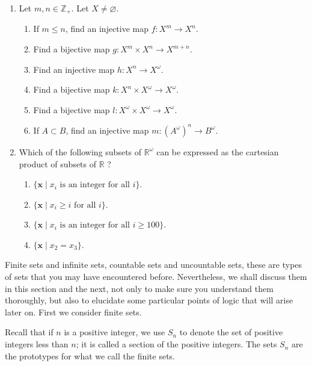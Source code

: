 \begin{enumerate}[itemsep=0.4em, parsep=0pt, topsep=0pt, partopsep=0pt, leftmargin=*, label=\arabic*., ref=\arabic*]
\item Let \(m,n \in {\mathbb{Z}}_{+}\). Let \(X \neq \varnothing\).
  \begin{enumerate}[itemsep=0.2em, parsep=0pt, topsep=0pt, partopsep=0pt, leftmargin=*, label=(\alph*), align=left]
  \item If \(m \leq n\), find an injective map \(f : X^{m} \rightarrow {X}^{n}\).
  \item Find a bijective map \(g : X^{m} \times {X}^{n} \rightarrow {X}^{m + n}\).
  \item Find an injective map \(h : X^{n} \rightarrow {X}^{\omega }\).
  \item Find a bijective map \(k : X^{n} \times {X}^{\omega } \rightarrow {X}^{\omega }\).
  \item Find a bijective map \(l : X^{\omega } \times {X}^{\omega } \rightarrow {X}^{\omega }\).
  \item If \(A \subset B\), find an injective map \(m : {(A^{\omega }) }^{n} \rightarrow {B}^{\omega }\).
  \end{enumerate}
\item Which of the following subsets of \(\mathbb{R}^{\omega }\) can be expressed as the cartesian product of subsets of \(\mathbb{R}\) ?
  \begin{enumerate}[itemsep=0.2em, parsep=0pt, topsep=0pt, partopsep=0pt, leftmargin=*, label=(\alph*), align=left]
  \item \(\{ {\mathbf{x} \mid {x}_{i}\text{ is an integer for all }i}\}\).
  \item \(\{ {\mathbf{x} \mid {x}_{i} \geq i\text{ for all }i}\}\).
  \item \(\{ {\mathbf{x} \mid {x}_{i}\text{ is an integer for all }i \geq {100}}\}\).
  \item \(\{ {\mathbf{x} \mid {x}_{2} = x_{3}}\}\).
  \end{enumerate}
\end{enumerate}


Finite sets and infinite sets, countable sets and uncountable sets, 
these are types of sets that you may have encountered before. 
Nevertheless, we shall discuss them in this section and the next, 
not only to make sure you understand them thoroughly, 
but also to elucidate some particular points of logic that will arise later on. 
First we consider finite sets.

Recall that if \(n\) is a positive integer, 
we use \(S_{n}\) to denote the set of positive integers less than \(n\); 
it is called a section of the positive integers. The sets \(S_{n}\) 
are the prototypes for what we call the finite sets.

